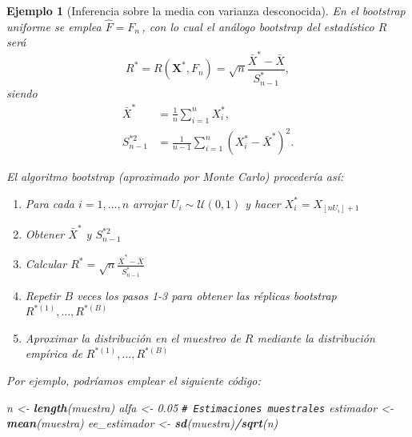 \documentclass[
  spanish,
  10pt,
]{book}
\newenvironment{Shaded}{\begin{snugshade}}{\end{snugshade}}
\newcommand{\CommentTok}[1]{\textcolor[rgb]{0.56,0.35,0.01}{\textit{#1}}}
\newcommand{\FloatTok}[1]{\textcolor[rgb]{0.00,0.00,0.81}{#1}}
\newcommand{\FunctionTok}[1]{\textcolor[rgb]{0.13,0.29,0.53}{\textbf{#1}}}
\newcommand{\NormalTok}[1]{#1}
\newcommand{\OtherTok}[1]{\textcolor[rgb]{0.56,0.35,0.01}{#1}}
\newcommand{\SpecialCharTok}[1]{\textcolor[rgb]{0.81,0.36,0.00}{\textbf{#1}}}
\renewcommand{\mathbf}[1]{\symbf{#1}}
\theoremstyle{break}
\newtheorem{example}{Ejemplo}[chapter]
\theoremstyle{nonumberplain}
\renewcommand{\CommentTok}[1]{\textcolor[rgb]{0.41,0.41,0.41}{\texttt{#1}}}
\begin{document}
\begin{example}[Inferencia sobre la media con varianza desconocida]
En el bootstrap uniforme se emplea \(\hat{F}=F_n\,\), con lo cual el análogo bootstrap del estadístico \(R\) será
\[R^{\ast}=R\left( \mathbf{X}^{\ast},F_n \right) =\sqrt{n}\frac{\bar{X}^{\ast}-\bar{X}}{S_{n-1}^{\ast}},\]
siendo
\[\begin{aligned}
\bar{X}^{\ast} &= \frac{1}{n}\sum_{i=1}^{n}X_i^{\ast}, \\
S_{n-1}^{\ast 2} &= \frac{1}{n-1}\sum_{i=1}^{n}\left( X_i^{\ast}-
\bar{X}^{\ast} \right)^2.
\end{aligned}\]

El algoritmo bootstrap (aproximado por Monte Carlo) procedería así:

\begin{enumerate}
\def\labelenumi{\arabic{enumi}.}
\item
  Para cada \(i=1,\ldots ,n\) arrojar \(U_i\sim \mathcal{U}\left( 0,1 \right)\) y
  hacer \(X_i^{\ast}=X_{\left\lfloor nU_i\right\rfloor +1}\)
\item
  Obtener \(\bar{X}^{\ast}\) y \(S_{n-1}^{\ast 2}\)
\item
  Calcular
  \(R^{\ast}=\sqrt{n}\frac{\bar{X}^{\ast}-\bar{X}}{
  S_{n-1}^{\ast}}\)
\item
  Repetir \(B\) veces los pasos 1-3 para obtener las réplicas bootstrap
  \(R^{\ast (1)}, \ldots, R^{\ast (B)}\)
\item
  Aproximar la distribución en el muestreo de \(R\) mediante la
  distribución empírica de \(R^{\ast (1)}, \ldots, R^{\ast (B)}\)
\end{enumerate}

Por ejemplo, podríamos emplear el siguiente código:

\begin{Shaded}
\begin{Highlighting}[]
\NormalTok{n }\OtherTok{\textless{}{-}} \FunctionTok{length}\NormalTok{(muestra)}
\NormalTok{alfa }\OtherTok{\textless{}{-}} \FloatTok{0.05}
\CommentTok{\# Estimaciones muestrales}
\NormalTok{estimador }\OtherTok{\textless{}{-}} \FunctionTok{mean}\NormalTok{(muestra)}
\NormalTok{ee\_estimador }\OtherTok{\textless{}{-}} \FunctionTok{sd}\NormalTok{(muestra)}\SpecialCharTok{/}\FunctionTok{sqrt}\NormalTok{(n)}


\end{Highlighting}
\end{Shaded}
\end{example}
\end{document}
